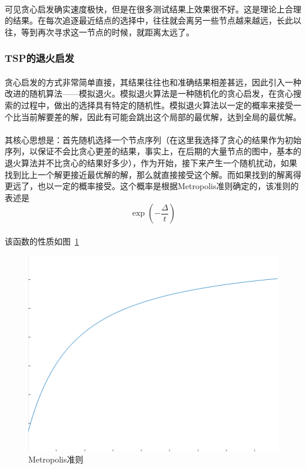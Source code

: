 \documentclass[UTF8,a4paper]{ctexart}
\begin{document}
\paragraph{}可见贪心启发确实速度极快，但是在很多测试结果上效果很不好。这是理论上合理的结果。在每次追逐最近结点的选择中，往往就会离另一些节点越来越远，长此以往，等到再次寻求这一节点的时候，就距离太远了。

\subsubsection{TSP的退火启发}
\paragraph{}贪心启发的方式非常简单直接，其结果往往也和准确结果相差甚远，因此引入一种改进的随机算法——模拟退火。模拟退火算法是一种随机化的贪心启发，在贪心搜索的过程中，做出的选择具有特定的随机性。模拟退火算法以一定的概率来接受一个比当前解要差的解，因此有可能会跳出这个局部的最优解，达到全局的最优解。
\paragraph{}其核心思想是：首先随机选择一个节点序列（在这里我选择了贪心的结果作为初始序列，以保证不会比贪心更差的结果，事实上，在后期的大量节点的图中，基本的退火算法并不比贪心的结果好多少），作为开始，接下来产生一个随机扰动，如果找到比上一个解更接近最优解的解，那么就直接接受这个解。而如果找到的解离得更远了，也以一定的概率接受。这个概率是根据Metropolis准则确定的，该准则的表述是
\[
    \exp\left(-\frac{\Delta}{t}\right)
\]
\paragraph{}该函数的性质如图~\ref{fig:metropolis}
\begin{figure}[htbp]
    \centering
    \includegraphics[scale=0.8]{metropolis.png}
    \caption{Metropolis准则}
    \label{fig:metropolis}
\end{figure}
\end{document}
